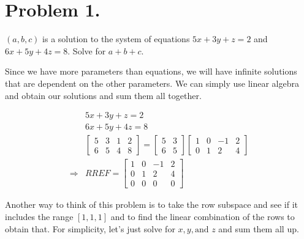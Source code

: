 \section{Problem 1.}

$(a, b, c)$ is a solution to the system of equations {$5x + 3y + z = 2$   and  $6x + 5y + 4z = 8$}.  Solve for $a + b + c$.

\begin{solution}
Since we have more parameters than equations, we will have infinite solutions that 
are dependent on the other parameters. We can simply use linear algebra and obtain
our solutions and sum them all together.

\begin{align*}
    & 5x + 3y + z = 2 \\
    & 6x + 5y + 4z = 8 \\
    & \begin{bmatrix}
            5 & 3 & 1 & 2 \\
            6 & 5 & 4 & 8
    \end{bmatrix}
    =
    \begin{bmatrix}
            5 & 3\\
            6 & 5
    \end{bmatrix}
    \begin{bmatrix}
            1 & 0 & -1 & 2 \\
            0 & 1 & 2 & 4
    \end{bmatrix} \\
    \Longrightarrow & RREF = \begin{bmatrix}
            1 & 0 & -1 & 2 \\
            0 & 1 & 2 & 4 \\
            0 & 0 & 0 & 0
    \end{bmatrix}
\end{align*}

Another way to think of this problem is to take the row subspace and see if it includes
the range $[1, 1, 1]$ and to find the linear combination of the rows to obtain that. For simplicity,
let's just solve for $x, y, \text{and }z$ and sum them all up.


\end{solution}
